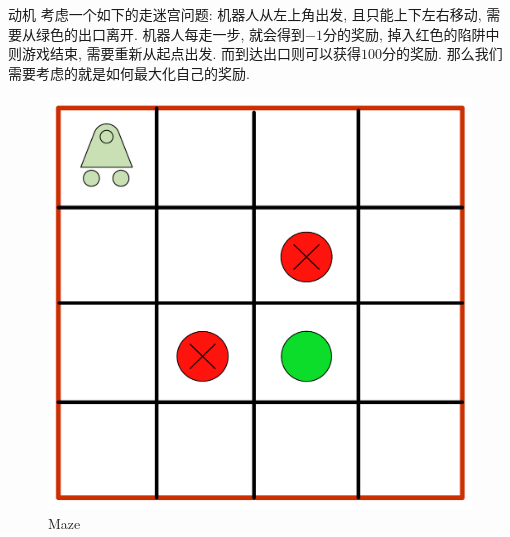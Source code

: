 \documentclass{beamer}
\begin{document}
\begin{frame}{动机}
    \footnotesize
    考虑一个如下的走迷宫问题: 机器人从左上角出发, 且只能上下左右移动, 需要从绿色的出口离开. 机器人每走一步, 就会得到$-1$分的奖励, 掉入红色的陷阱中则游戏结束, 需要重新从起点出发. 而到达出口则可以获得$100$分的奖励. 那么我们需要考虑的就是如何最大化自己的奖励.
    \begin{figure}
        \centering
        \includegraphics[scale=0.2]{pic/maze.pdf}
        \caption{Maze}
        \label{fig:maze}
    \end{figure}
\end{frame}
\end{document}
